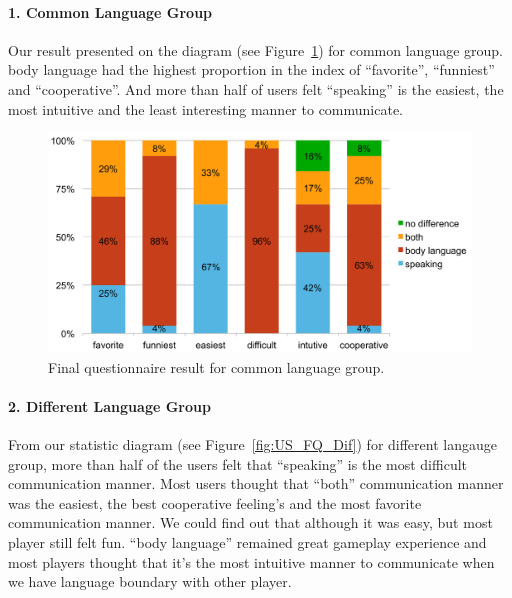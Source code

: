 \paragraph{1. Common Language Group}
Our result presented on the diagram (see Figure~\ref{fig:US_FQ_Com}) for common language group. 
body language had the highest proportion in the index of ``favorite'', ``funniest'' and ``cooperative''.
And more than half of users felt ``speaking'' is the easiest, the most intuitive and the least interesting manner to communicate.

\begin{figure}[!h]
\centering
\includegraphics[width=0.9\columnwidth]{Figures/US_FQ_Com.pdf}
\caption{Final questionnaire result for common language group.}
\label{fig:US_FQ_Com}
\end{figure}

\paragraph{2. Different Language Group}
From our statistic diagram (see Figure~\ref{fig:US_FQ_Dif}) for different langauge group, more than half of the users felt that ``speaking'' is the most difficult communication manner.
Most users thought that ``both'' communication manner was the easiest, the best cooperative feeling's and the most favorite communication manner. We could find out that although it was easy, but most player still felt fun. ``body language'' remained great gameplay experience and most players thought that it's the most intuitive manner to communicate when we have language boundary with other player.

